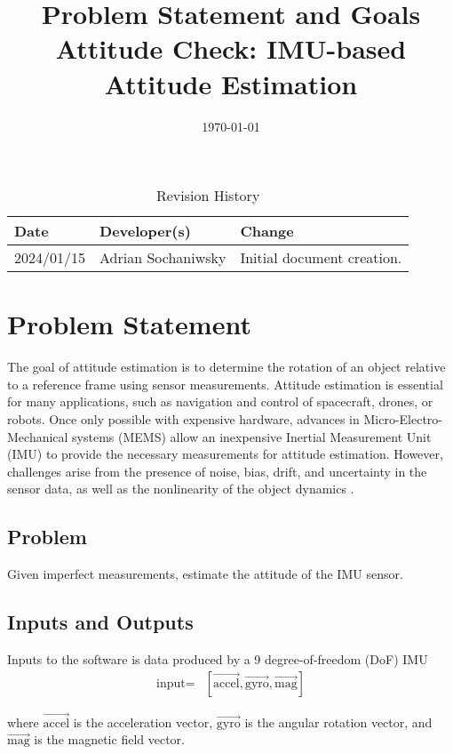 \documentclass{article}
\title{Problem Statement and Goals \\ Attitude Check: IMU-based Attitude Estimation}
\author{\authname}
\date{\today}
\begin{document}
\maketitle

\begin{table}[hp]
\caption{Revision History} \label{TblRevisionHistory}
\begin{tabularx}{\textwidth}{llX}
\toprule
\textbf{Date} & \textbf{Developer(s)} & \textbf{Change}\\
\midrule
2024/01/15 & Adrian Sochaniwsky & Initial document creation.\\
\bottomrule
\end{tabularx}
\end{table}

\section{Problem Statement}

The goal of attitude estimation is to determine the rotation of an object relative to a reference
frame using sensor measurements. Attitude estimation is essential for many applications, such as
navigation and control of spacecraft, drones, or robots. Once only possible with expensive hardware,
advances in Micro-Electro-Mechanical systems (MEMS) allow an inexpensive Inertial Measurement Unit
(IMU) to provide the necessary measurements for attitude estimation. However, challenges arise from
the presence of noise, bias, drift, and uncertainty in the sensor data, as well as the nonlinearity
of the object dynamics \cite{statement}.

\subsection{Problem}

Given imperfect measurements, estimate the attitude of the IMU sensor.

\subsection{Inputs and Outputs}

Inputs to the software is data produced by a 9 degree-of-freedom (DoF) IMU
\begin{align*}
    \text{input} =& [\vec{\text{accel}}, \vec{\text{gyro}}, \vec{\text{mag}}]
\end{align*}

where $\vec{\text{accel}}$ is the acceleration vector, $\vec{\text{gyro}}$ is the angular rotation
vector, and $\vec{\text{mag}}$ is the magnetic field vector.
\end{document}
